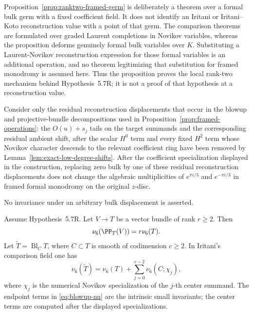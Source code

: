 \begin{remark}
\label{rem:ranktwo-germ-scope}
Proposition~\ref{prop:ranktwo-framed-germ} is deliberately a theorem over a
formal bulk germ with a fixed coefficient field.  It does not identify an
Iritani or Iritani--Koto reconstruction value with a point of that germ.
The comparison theorems are formulated over graded Laurent completions in
Novikov variables, whereas the proposition deforms genuinely formal bulk
variables over $K$.  Substituting a Laurent-Novikov reconstruction expression
for those formal variables is an additional operation, and no theorem
legitimizing that substitution for framed monodromy is assumed here.  Thus
the proposition proves the local rank-two mechanism behind
Hypothesis~5.7R; it is not a proof of that hypothesis at a reconstruction
value.
\end{remark}

\begin{hypothesisR}
Consider only the residual reconstruction displacements that occur in the
blowup and projective-bundle decompositions used in
Proposition~\ref{prop:framed-operations}: the $O(u)+s_j$ tails on the target
summands and the corresponding residual ambient shift, after the scalar
$H^0$ term and every fixed $H^2$ term whose Novikov character descends to
the relevant coefficient ring have been removed by
Lemma~\ref{lem:exact-low-degree-shifts}.  After the coefficient
specialization displayed in the construction, replacing zero bulk by one of
these residual reconstruction displacements does not change the algebraic
multiplicities of $e^{\pi i/3}$ and $e^{-\pi i/3}$ in framed formal
monodromy on the original $z$-disc.

No invariance under an arbitrary bulk displacement is asserted.
\end{hypothesisR}



\begin{proposition}
\label{prop:framed-operations}
%
%
Assume Hypothesis~5.7R.
Let \(V\to T\) be a vector bundle of rank \(r\ge2\).  Then
\[
 \nu_6(\PP_T(V))=r\nu_6(T).
 \label{eq:projective-bundle-nu}
\]
Let \(\widetilde T=\operatorname{Bl}_C T\), where \(C\subset T\) is smooth of
codimension \(c\ge2\).  In Iritani's comparison field one has
\[
 \nu_6(\widetilde T)=\nu_6(T)+
 \sum_{j=0}^{c-2}\nu_6(C;\chi_j),
 \label{eq:blowup-nu}
\]
where \(\chi_j\) is the numerical Novikov specialization of the \(j\)-th
center summand.  The endpoint terms in \eqref{eq:blowup-nu} are the intrinsic small
invariants; the center terms are computed after the displayed specializations.
\end{proposition}

